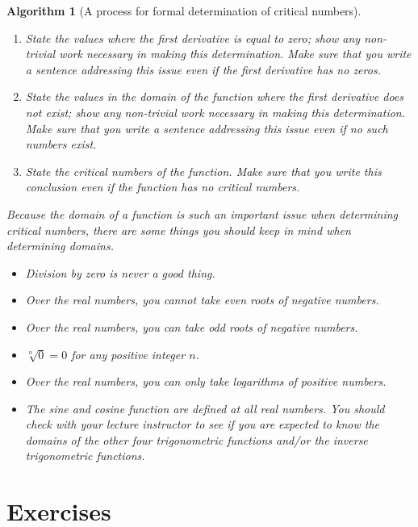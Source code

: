\documentclass[12pt,]{book}
\theoremstyle{plain}
\newtheorem{algorithm}[theorem]{Algorithm}
\theoremstyle{definition}
\numberwithin{equation}{section}
\begin{document}
\begin{algorithm}[A process for formal determination of critical numbers]
\begin{enumerate}
                \item{}State the values where the first derivative is equal to zero; show any non-trivial work necessary in making this determination.  Make sure that you write a sentence addressing this issue even if the first derivative has no zeros.\item{}State the values \emph{in the domain of the function} where the first derivative does not exist; show any non-trivial work necessary in making this determination.    Make sure that you write a sentence addressing this issue even if no such numbers exist.\item{}State the critical numbers of the function.  Make sure that you write this conclusion even if the function has no critical numbers.\end{enumerate}
\par
Because the domain of a function is such an important issue when determining critical numbers, there are some things you should keep in mind when determining domains.%
\begin{itemize}[label=\textbullet]
\item{}Division by zero is never a good thing.\item{}Over the real numbers, you \emph{cannot} take \emph{even} roots of negative numbers.\item{}Over the real numbers, you \emph{can} take \emph{odd} roots of negative numbers.\item{}\(\sqrt[n]{0}=0\) for any positive integer \(n\).\item{}Over the real numbers, you can only take logarithms of positive numbers.\item{}The sine and cosine function are defined at all real numbers.  You should check with your lecture instructor to see if you are expected to know the domains of the other four trigonometric functions and/or the inverse trigonometric functions.\end{itemize}
\end{algorithm}
\typeout{************************************************}
\typeout{************************************************}
\section*{Exercises}\label{exercises-48}
\end{document}
